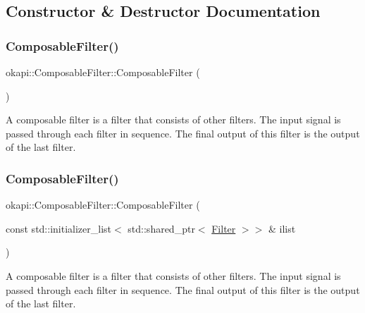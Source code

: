 \subsection{Constructor \& Destructor Documentation}
\mbox{\label{classokapi_1_1ComposableFilter_a02bc789153f129d7de29ff96bd8d79d6}} 
\subsubsection{\texorpdfstring{ComposableFilter()}{ComposableFilter()}\hspace{0.1cm}{\footnotesize\ttfamily [1/2]}}
{\footnotesize\ttfamily okapi\+::\+Composable\+Filter\+::\+Composable\+Filter (\begin{DoxyParamCaption}{ }\end{DoxyParamCaption})\hspace{0.3cm}{\ttfamily [default]}}

A composable filter is a filter that consists of other filters. The input signal is passed through each filter in sequence. The final output of this filter is the output of the last filter. \mbox{\label{classokapi_1_1ComposableFilter_ab435425858bcf6710a9ffc1fdcd84fa0}} 
\subsubsection{\texorpdfstring{ComposableFilter()}{ComposableFilter()}\hspace{0.1cm}{\footnotesize\ttfamily [2/2]}}
{\footnotesize\ttfamily okapi\+::\+Composable\+Filter\+::\+Composable\+Filter (\begin{DoxyParamCaption}\item[{const std\+::initializer\+\_\+list$<$ std\+::shared\+\_\+ptr$<$ \mbox{\hyperlink{classokapi_1_1Filter}{Filter}} $>$$>$ \&}]{ilist }\end{DoxyParamCaption})}

A composable filter is a filter that consists of other filters. The input signal is passed through each filter in sequence. The final output of this filter is the output of the last filter.



